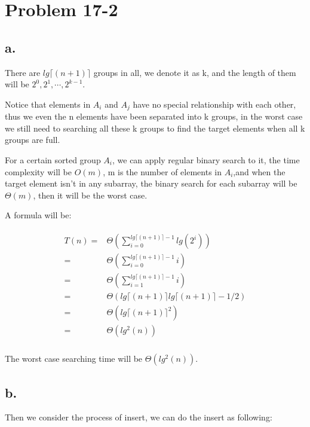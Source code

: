 \documentclass[oneside]{homework} %
\begin{document}
\maketitle
\newpage
\section{Problem 17-2}
\subsection*{a.}
There are $lg\lceil (n+1) \rceil$ groups in all, we denote it as k, and the length of them will be $2^{0},2^{1},\cdots,2^{k-1}$.

Notice that elements in $A_{i}$ and $A_{j}$ have no special relationship with each other, thus we even the n elements have been separated into k groups, in the worst case we still need to searching all these k groups to find the target elements when all k groups are full.

For a certain sorted group $A_{i}$, we can apply regular binary search to it, the time complexity will be $O(m)$, m is the number of elements in $A_{i}$,and when the target element isn't in any subarray, the binary search for each subarray will be $\Theta(m)$, then it will be the worst case.

A formula will be:

\begin{eqnarray}
  \begin{split}
	T(n) =& \Theta(\sum\limits_{i=0}^{lg\lceil (n+1) \rceil-1}lg(2^{i})) \\
	     =& \Theta(\sum\limits_{i=0}^{lg\lceil (n+1) \rceil-1}i) \\
	     =& \Theta(\sum\limits_{i=1}^{lg\lceil (n+1) \rceil-1}i) \\
	     =& \Theta({lg\lceil (n+1) \rceil}{lg\lceil (n+1) \rceil-1}/2) \\
		 =& \Theta({lg\lceil (n+1) \rceil}^{2}) \\
		 =& \Theta(lg^{2}(n)) \\
  \end{split}
  \label{equ:bs}
\end{eqnarray}

The worst case searching time will be $\Theta(lg^{2}(n))$.

\subsection*{b.}
Then we consider the process of insert, we can do the insert as following:
\end{document}
